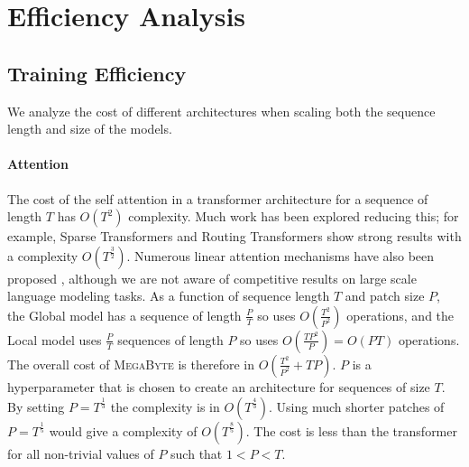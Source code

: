 \documentclass{article}
\newcommand{\fastslow}[0]{\textsc{MegaByte}\xspace}
\newcommand{\megabyte}[0]{\fastslow}
\theoremstyle{plain}
\theoremstyle{definition}
\theoremstyle{remark}
\begin{document}
\section{Efficiency Analysis}
\subsection{Training Efficiency}
We analyze the cost of different architectures when scaling both the sequence length and size of the models.

\paragraph{Attention} The cost of the self attention in a transformer architecture for a sequence of length $T$ has $O(T^2)$ complexity. Much work has been explored reducing this; for example, Sparse Transformers \citep{sparsetransformer} and Routing Transformers \citep{routing} show strong results with a complexity $O(T^\frac{3}{2})$. Numerous linear attention mechanisms have also been proposed \citep{lineartransformer,linear, performer}, although we are not aware of competitive results on large scale language modeling tasks. As a function of sequence length $T$ and patch size $P$, the Global model has a sequence of length $\frac{P}{T}$ so uses $O(\frac{T^2}{P^2})$ operations, and the Local model uses $\frac{P}{T}$ sequences of length $P$ so uses $O(\frac{TP^2}{P})=O(PT)$ operations. The overall cost of \megabyte is therefore in $O(\frac{T^2}{P^2}+TP)$. $P$ is a hyperparameter that is chosen to create an architecture for sequences of size $T$. By setting $P=T^\frac{1}{3}$ the complexity is in $O(T^\frac{4}{3})$. Using much shorter patches of $P=T^\frac{1}{5}$ would give a complexity of $O(T^\frac{8}{5})$. The cost is less than the transformer for all non-trivial values of $P$ such that $1<P<T$. 
\end{document}
